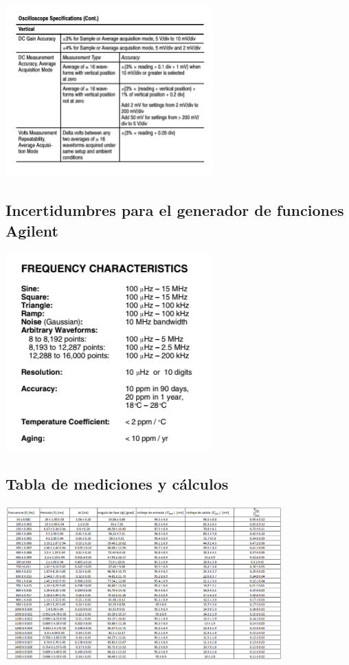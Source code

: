 \documentclass[DIV=calc, paper=a4, fontsize=11pt]{scrartcl}
\newenvironment{Figura}
  {\par\medskip\noindent\minipage{\linewidth}}
  {\endminipage\par\medskip}
\begin{document}
\begin{Figura}
    \centering
    \includegraphics[width=0.6\textwidth]{incertidumbres osciloscopio tektronix 2.PNG}
    \label{fig}
\end{Figura}

\subsection*{Incertidumbres para el generador de funciones Agilent}

\begin{Figura}
    \centering
    \includegraphics[width=0.6\textwidth]{incertidumbres generador de funciones agilent.PNG}
    \label{fig}
\end{Figura}

\subsection*{Tabla de mediciones y cálculos}


\begin{Figura}
    \centering
    \includegraphics[width=0.8\textwidth]{tabla.PNG}
    \label{fig}
\end{Figura}
\end{document}
